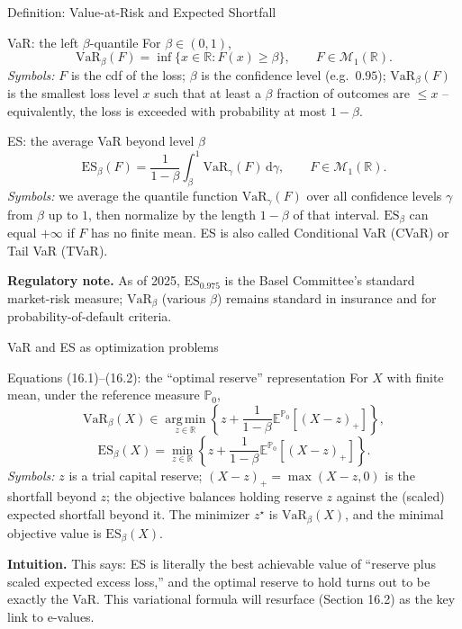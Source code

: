 \documentclass[aspectratio=169,10pt]{beamer}
\newcommand{\PP}{\mathbb{P}}
\newcommand{\EE}{\mathbb{E}}
\newcommand{\RR}{\mathbb{R}}
\newcommand{\1}{\mathbb{1}}
\begin{document}
\begin{frame}{Definition: Value-at-Risk and Expected Shortfall}

\begin{block}{VaR: the left $\beta$-quantile}
For $\beta \in (0,1)$,
\[
\mathrm{VaR}_\beta(F) = \inf\{x \in \RR : F(x) \ge \beta\}, \qquad F \in \mathcal M_1(\RR).
\]
\emph{Symbols:} $F$ is the cdf of the loss; $\beta$ is the confidence level (e.g.\ $0.95$); $\mathrm{VaR}_\beta(F)$ is the smallest loss level $x$ such that at least a $\beta$ fraction of outcomes are $\le x$ -- equivalently, the loss is exceeded with probability at most $1-\beta$.
\end{block}

\begin{block}{ES: the average VaR beyond level $\beta$}
\[
\mathrm{ES}_\beta(F) = \frac{1}{1-\beta}\int_\beta^1 \mathrm{VaR}_\gamma(F)\, \mathrm d\gamma, \qquad F \in \mathcal M_1(\RR).
\]
\emph{Symbols:} we average the quantile function $\mathrm{VaR}_\gamma(F)$ over all confidence levels $\gamma$ from $\beta$ up to $1$, then normalize by the length $1-\beta$ of that interval. $\mathrm{ES}_\beta$ can equal $+\infty$ if $F$ has no finite mean. ES is also called Conditional VaR (CVaR) or Tail VaR (TVaR).
\end{block}

\textbf{Regulatory note.} As of 2025, $\mathrm{ES}_{0.975}$ is the Basel Committee's standard market-risk measure; $\mathrm{VaR}_\beta$ (various $\beta$) remains standard in insurance and for probability-of-default criteria.

\end{frame}

\begin{frame}{VaR and ES as optimization problems}

\begin{block}{Equations (16.1)--(16.2): the ``optimal reserve'' representation}
For $X$ with finite mean, under the reference measure $\PP_0$,
\[
\mathrm{VaR}_\beta(X) \in \operatorname*{arg\,min}_{z \in \RR} \left\{ z + \frac{1}{1-\beta}\EE^{\PP_0}[(X-z)_+] \right\},
\]
\[
\mathrm{ES}_\beta(X) = \min_{z \in \RR} \left\{ z + \frac{1}{1-\beta}\EE^{\PP_0}[(X-z)_+] \right\}.
\]
\emph{Symbols:} $z$ is a trial capital reserve; $(X-z)_+ = \max(X-z,0)$ is the shortfall beyond $z$; the objective balances holding reserve $z$ against the (scaled) expected shortfall beyond it. The minimizer $z^\star$ is $\mathrm{VaR}_\beta(X)$, and the minimal objective value is $\mathrm{ES}_\beta(X)$.
\end{block}

\textbf{Intuition.} This says: ES is literally the best achievable value of ``reserve plus scaled expected excess loss,'' and the optimal reserve to hold turns out to be exactly the VaR. This variational formula will resurface (Section 16.2) as the key link to e-values.

\end{frame}
\end{document}
